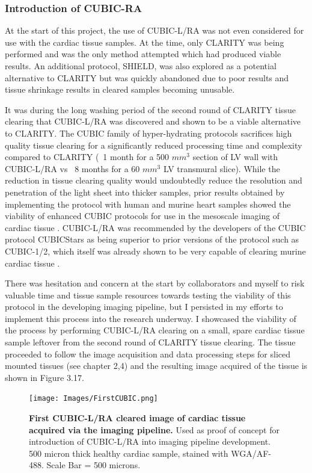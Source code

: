 \subsubsection{Introduction of CUBIC-RA}
At the start of this project, the use of CUBIC-L/RA was not even considered for use with the cardiac tissue samples. At the time, only CLARITY was being performed and was the only method attempted which had produced viable results. An additional protocol, SHIELD, was also explored as a potential alternative to CLARITY but was quickly abandoned due to poor results and tissue shrinkage results in cleared samples becoming unusable. 

It was during the long washing period of the second round of CLARITY tissue clearing that CUBIC-L/RA was discovered and shown to be a viable alternative to CLARITY. The CUBIC family of hyper-hydrating protocols sacrifices high quality tissue clearing for a significantly reduced processing time and complexity compared to CLARITY (~1 month for a 500 $mm^3$ section of LV wall with CUBIC-L/RA vs ~8 months for a 60 $mm^3$ LV transmural slice). While the reduction in tissue clearing quality would undoubtedly reduce the resolution and penetration of the light sheet into thicker samples, prior results obtained by implementing the protocol with human and  murine heart samples showed the viability of enhanced CUBIC protocols for use in the mesoscale imaging of cardiac tissue \cite{sands_its_2022,tainaka_chemical_2018}. CUBIC-L/RA was recommended by the developers of the CUBIC protocol CUBICStars as being superior to prior versions of the protocol such as CUBIC-1/2, which itself was already shown to be very capable of clearing murine cardiac tissue \cite{sands_its_2022, ueda_cubic_nodate}. 

There was hesitation and concern at the start by collaborators and myself to risk valuable time and tissue sample resources towards testing the viability of this protocol in the developing imaging pipeline, but I persisted in my efforts to implement this process into the research underway. I showcased the viability of the process by performing CUBIC-L/RA clearing on a small, spare cardiac tissue sample leftover from the second round of CLARITY tissue clearing. The tissue proceeded to follow the image acquisition and data processing steps for sliced mounted tissues (see chapter 2,4) and the resulting image acquired of the tissue is shown in Figure 3.17.

\begin{figure}[H]
    \centering
    \texttt{[image: Images/FirstCUBIC.png]}
    \caption{\textbf{First CUBIC-L/RA cleared image of cardiac tissue acquired via the imaging pipeline.} Used as proof of concept for introduction of CUBIC-L/RA into imaging pipeline development. 500 micron thick healthy cardiac sample, stained with WGA/AF-488. Scale Bar = 500 microns.}
    \label{fig:enter-label}
\end{figure}

